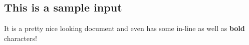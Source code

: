 \subsection{This is a sample input}

It is a pretty nice looking document and even has some in-line  as well as \textbf{bold} characters!

